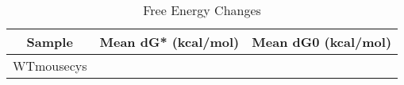 \documentclass{article}
\begin{document}
\begin{table}[ht]
    \centering
    \begin{tabular}{|c|c|c|}
    \hline
    Sample & Mean dG* (kcal/mol) & Mean dG0 (kcal/mol) \\
    \hline
    WTmousecys &  &  \\
    \hline
    \end{tabular}
    \caption{Free Energy Changes}
\end{table}
\end{document}
